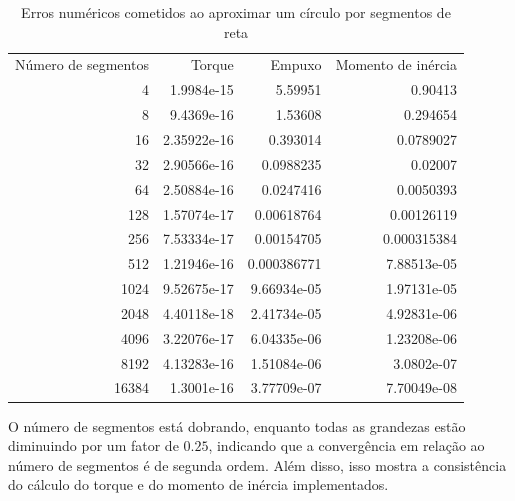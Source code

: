 \documentclass[
	12pt,				%
	oneside,			%
	a4paper,			%
	]{article}
\begin{document}
    \begin{table}[H]
        \centering
        \begin{tabular}{rrrr} \\

            
            \hline
 \\
\hline
            Número de segmentos &      Torque &      Empuxo &   Momento de inércia \\

            \hline
                                4 &  1.9984e-15 &     5.59951 &              0.90413 \\
                                8 &  9.4369e-16 &     1.53608 &             0.294654 \\
                                16 & 2.35922e-16 &    0.393014 &            0.0789027 \\
                                32 & 2.90566e-16 &   0.0988235 &              0.02007 \\
                                64 & 2.50884e-16 &   0.0247416 &            0.0050393 \\
                            128 & 1.57074e-17 &  0.00618764 &           0.00126119 \\
                            256 & 7.53334e-17 &  0.00154705 &          0.000315384 \\
                            512 & 1.21946e-16 & 0.000386771 &          7.88513e-05 \\
                            1024 & 9.52675e-17 & 9.66934e-05 &          1.97131e-05 \\
                            2048 & 4.40118e-18 & 2.41734e-05 &          4.92831e-06 \\
                            4096 & 3.22076e-17 & 6.04335e-06 &          1.23208e-06 \\
                            8192 & 4.13283e-16 & 1.51084e-06 &           3.0802e-07 \\
                            16384 &  1.3001e-16 & 3.77709e-07 &          7.70049e-08 \\

            \hline
        \end{tabular}
        \caption{Erros numéricos cometidos ao aproximar um círculo por segmentos de reta}
        \label{table:conv_circle2}
    \end{table}

    O número de segmentos está dobrando, enquanto todas as grandezas estão diminuindo por um fator de $0.25$, indicando que a convergência em relação ao número de segmentos é de segunda ordem. Além disso, isso mostra a consistência do cálculo do torque e do momento de inércia implementados.
\end{document}
